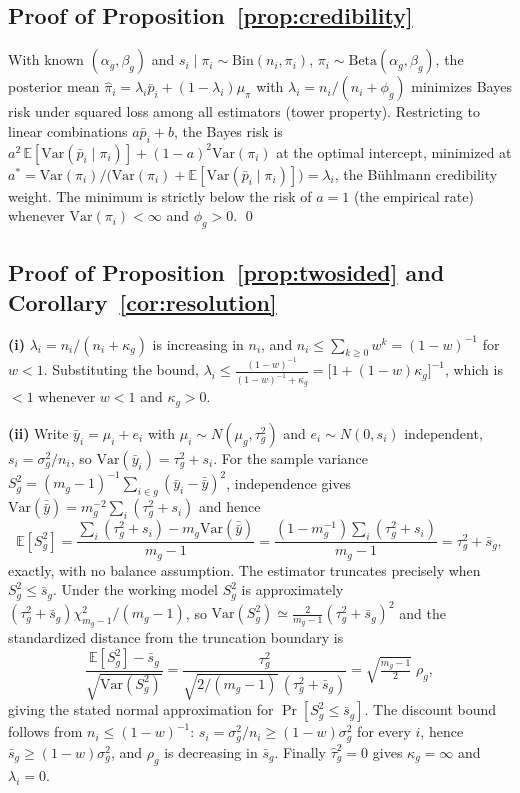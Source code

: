 \documentclass[twoside]{article}
\theoremstyle{definition}
\newcommand{\E}{\mathbb{E}}
\newcommand{\Var}{\mathrm{Var}}
\begin{document}
\subsection{Proof of Proposition~\ref{prop:credibility}}
With known $(\alpha_g,\beta_g)$ and $s_i\mid\pi_i\sim
\mathrm{Bin}(n_i,\pi_i)$, $\pi_i\sim\mathrm{Beta}(\alpha_g,\beta_g)$,
the posterior mean $\hat\pi_i=\lambda_i\bar p_i+(1-\lambda_i)\mu_\pi$
with $\lambda_i=n_i/(n_i+\phi_g)$ minimizes Bayes risk under squared
loss among all estimators (tower property). Restricting to linear
combinations $a\bar p_i+b$, the Bayes risk is
$a^2\,\E[\Var(\bar p_i\mid\pi_i)] + (1-a)^2\Var(\pi_i)$ at the optimal
intercept, minimized at
$a^{*}=\Var(\pi_i)/\bigl(\Var(\pi_i)+\E[\Var(\bar p_i\mid\pi_i)]\bigr)
=\lambda_i$, the B\"uhlmann credibility weight. The minimum is strictly
below the risk of $a=1$ (the empirical rate) whenever
$\Var(\pi_i)<\infty$ and $\phi_g>0$. \qed

\subsection{Proof of Proposition~\ref{prop:twosided} and
Corollary~\ref{cor:resolution}}

\textbf{(i)} $\lambda_i=n_i/(n_i+\kappa_g)$ is increasing in $n_i$, and
$n_i\le\sum_{k\ge0}w^{k}=(1-w)^{-1}$ for $w<1$. Substituting the bound,
$\lambda_i\le\frac{(1-w)^{-1}}{(1-w)^{-1}+\kappa_g}
=\bigl[1+(1-w)\kappa_g\bigr]^{-1}$, which is $<1$ whenever $w<1$ and
$\kappa_g>0$.

\textbf{(ii)} Write $\bar y_i=\mu_i+e_i$ with
$\mu_i\sim N(\mu_g,\tau_g^2)$ and $e_i\sim N(0,s_i)$ independent,
$s_i=\sigma_g^2/n_i$, so $\Var(\bar y_i)=\tau_g^2+s_i$. For the sample
variance $S_g^2=(m_g-1)^{-1}\sum_{i\in g}(\bar y_i-\bar{\bar y})^2$,
independence gives
$\Var(\bar{\bar y})=m_g^{-2}\sum_i(\tau_g^2+s_i)$ and hence
\[
\E[S_g^2]=\frac{\sum_i(\tau_g^2+s_i)-m_g\Var(\bar{\bar y})}{m_g-1}
=\frac{(1-m_g^{-1})\sum_i(\tau_g^2+s_i)}{m_g-1}
=\tau_g^2+\bar s_g ,
\]
exactly, with no balance assumption. The estimator truncates precisely
when $S_g^2\le\bar s_g$. Under the working model $S_g^2$ is
approximately $(\tau_g^2+\bar s_g)\chi^2_{m_g-1}/(m_g-1)$, so
$\Var(S_g^2)\simeq\frac{2}{m_g-1}(\tau_g^2+\bar s_g)^2$ and the
standardized distance from the truncation boundary is
\[
\frac{\E[S_g^2]-\bar s_g}{\sqrt{\Var(S_g^2)}}
=\frac{\tau_g^2}{\sqrt{2/(m_g-1)}\,(\tau_g^2+\bar s_g)}
=\sqrt{\tfrac{m_g-1}{2}}\;\rho_g ,
\]
giving the stated normal approximation for
$\Pr[S_g^2\le\bar s_g]$. The discount bound follows from
$n_i\le(1-w)^{-1}$: $s_i=\sigma_g^2/n_i\ge(1-w)\sigma_g^2$ for every
$i$, hence $\bar s_g\ge(1-w)\sigma_g^2$, and $\rho_g$ is decreasing in
$\bar s_g$. Finally $\hat\tau_g^2=0$ gives $\kappa_g=\infty$ and
$\lambda_i=0$.
\end{document}
